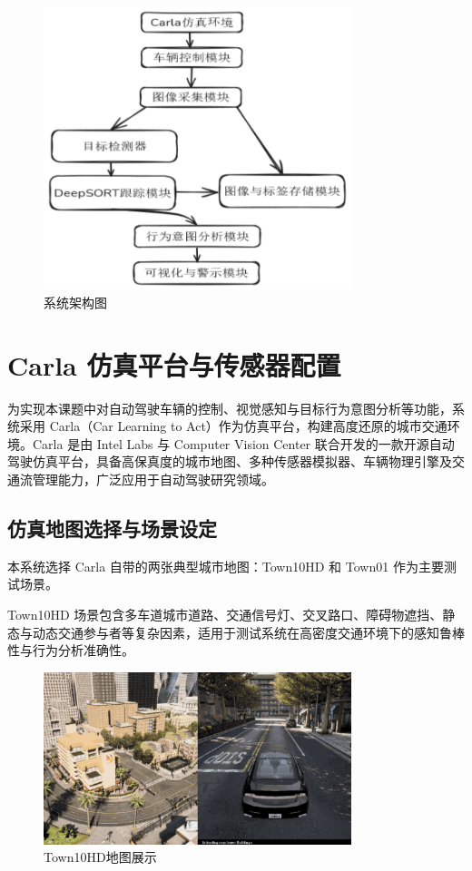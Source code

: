 \begin{figure}[H]
    \centering
    \includegraphics[width=0.8\textwidth]{images/图3 系统架构图.pdf}  %
    \caption{系统架构图}
    \label{fig:example_image}  %
\end{figure}

\section{Carla 仿真平台与传感器配置}

为实现本课题中对自动驾驶车辆的控制、视觉感知与目标行为意图分析等功能，系统采用 Carla（Car Learning to Act）作为仿真平台，构建高度还原的城市交通环境。Carla 是由 Intel Labs 与 Computer Vision Center 联合开发的一款开源自动驾驶仿真平台，具备高保真度的城市地图、多种传感器模拟器、车辆物理引擎及交通流管理能力，广泛应用于自动驾驶研究领域。

\subsection{仿真地图选择与场景设定}

本系统选择 Carla 自带的两张典型城市地图：Town10HD 和 Town01 作为主要测试场景。

Town10HD 场景包含多车道城市道路、交通信号灯、交叉路口、障碍物遮挡、静态与动态交通参与者等复杂因素，适用于测试系统在高密度交通环境下的感知鲁棒性与行为分析准确性。

\begin{figure}[H]
    \centering
    \includegraphics[width=0.8\textwidth]{images/图4 Town10HD地图展示.pdf}  %
    \caption{Town10HD地图展示}
    \label{fig:example_image}  %
\end{figure}

